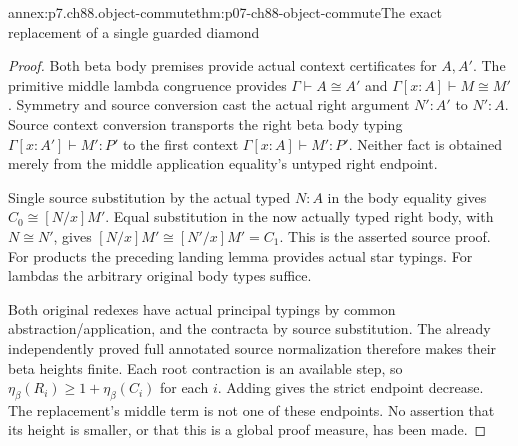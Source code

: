 \begin{annexitem}{annex:p7.ch88.object-commute}{thm:p07-ch88-object-commute}{The exact replacement of a single guarded diamond}
\begin{proof}
Both beta body premises provide actual context certificates for
\(A,A'\). The primitive middle lambda congruence provides
\(\Gamma\vdash A\cong A'\) and
\(\Gamma[x:A]\vdash M\cong M'\). Symmetry and source conversion
cast the actual right argument \(N':A'\) to \(N':A\).
Source context conversion transports the right beta body typing
\(\Gamma[x:A']\vdash M':P'\) to the first context
\(\Gamma[x:A]\vdash M':P'\). Neither fact is obtained merely
from the middle application equality's untyped right endpoint.

Single source substitution by the actual typed \(N:A\) in the body
equality gives \(C_0\cong[N/x]M'\). Equal substitution in the now
actually typed right body, with \(N\cong N'\), gives
\([N/x]M'\cong[N'/x]M'=C_1\). This is the asserted source proof.
For products the preceding landing lemma provides actual star typings.
For lambdas the arbitrary original body types suffice.

Both original redexes have actual principal typings by common
abstraction/application, and the contracta by source substitution.
The already independently proved full annotated source normalization
therefore makes their beta heights finite. Each root contraction is
an available step, so
\(\eta_\beta(R_i)\geq1+\eta_\beta(C_i)\) for each \(i\).
Adding gives the strict endpoint decrease. The replacement's middle
term is not one of these endpoints. No assertion that its height is
smaller, or that this is a global proof measure, has been made.
\end{proof}
\end{annexitem}

